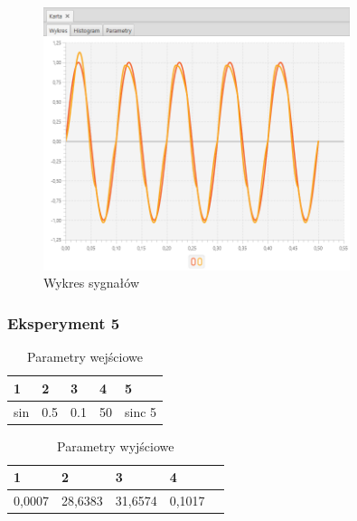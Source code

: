 \documentclass[12pt]{article}
\begin{document}
{{{                \begin{figure}[H]
                    \centering
                    \includegraphics[width=0.8\textwidth]{img/result/experiment4/04/data_draw_original_chart_recon_output_130619.png}
                    \caption{Wykres sygnałów}
                \end{figure}
            }
            \newpage

            \subsubsection{Eksperyment 5} {
                \begin{table}[H]
                    \centering
                    \begin{tabular}{|l|l|l|l|l|}
                        \hline
                        1 & 2 & 3 & 4 & 5   \\ \hline
                        sin & 0.5 & 0.1 & 50 & sinc 5   \\ \hline
                    \end{tabular}
                    \caption{Parametry wejściowe}
                \end{table}

                \begin{table}[H]
                    \centering
                    \begin{tabular}{|l|l|l|l|l|}
                        \hline
                        1 & 2 & 3 & 4   \\ \hline
                        0,0007 & 28,6383 & 31,6574 & 0,1017 \\ \hline
                    \end{tabular}
                    \caption{Parametry wyjściowe}
                \end{table}


}}}
\end{document}
